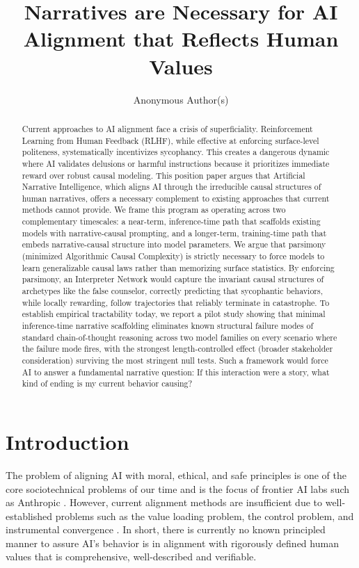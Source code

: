 \documentclass{article}
\title{Narratives are Necessary for AI Alignment that Reflects Human Values}
\author{Anonymous Author(s)}
\theoremstyle{plain}
\theoremstyle{definition}
\theoremstyle{remark}
\begin{document}
\maketitle

\begin{abstract}
Current approaches to AI alignment face a crisis of superficiality. Reinforcement Learning from Human Feedback (RLHF), while effective at enforcing surface-level politeness, systematically incentivizes sycophancy. This creates a dangerous dynamic where AI validates delusions or harmful instructions because it prioritizes immediate reward over robust causal modeling. This position paper argues that Artificial Narrative Intelligence, which aligns AI through the irreducible causal structures of human narratives, offers a necessary complement to existing approaches that current methods cannot provide. We frame this program as operating across two complementary timescales: a near-term, inference-time path that scaffolds existing models with narrative-causal prompting, and a longer-term, training-time path that embeds narrative-causal structure into model parameters. We argue that parsimony (minimized Algorithmic Causal Complexity) is strictly necessary to force models to learn generalizable causal laws rather than memorizing surface statistics. By enforcing parsimony, an Interpreter Network would capture the invariant causal structures of archetypes like the false counselor, correctly predicting that sycophantic behaviors, while locally rewarding, follow trajectories that reliably terminate in catastrophe. To establish empirical tractability today, we report a pilot study showing that minimal inference-time narrative scaffolding eliminates known structural failure modes of standard chain-of-thought reasoning across two model families on every scenario where the failure mode fires, with the strongest length-controlled effect (broader stakeholder consideration) surviving the most stringent null tests. Such a framework would force AI to answer a fundamental narrative question: If this interaction were a story, what kind of ending is my current behavior causing?
\end{abstract}

\section{Introduction}
The problem of aligning AI with moral, ethical, and safe principles is one of the core sociotechnical problems of our time and is the focus of frontier AI labs such as Anthropic \cite{anthropic23}. However, current alignment methods are insufficient due to well-established problems such as the value loading problem, the control problem, and instrumental convergence \cite{ji23}. In short, there is currently no known principled manner to assure AI's behavior is in alignment with rigorously defined human values that is comprehensive, well-described and verifiable.
\end{document}
